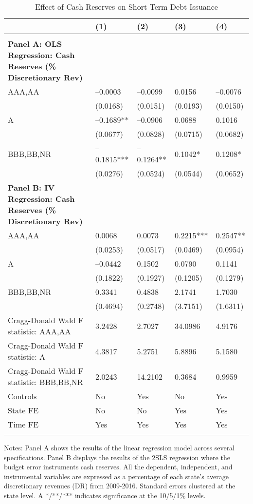 \documentclass{article}
\begin{document}
\begin{table}[tbp] \centering
{}

\caption{Effect of Cash Reserves on Short Term Debt Issuance}
\label{tab:Regression_StDebt}
\begin{tabularx}{\linewidth}{lCCCC}

\toprule
&{(1)}&{(2)}&{(3)}&{(4)} \tabularnewline \midrule
{}&{}&{}&{}&{} \tabularnewline
\midrule \addlinespace[\belowrulesep]
\textbf{Panel A: OLS Regression: Cash Reserves (\% Discretionary Rev)}&&&& \tabularnewline
\midrule AAA,AA&--0.0003&--0.0099&0.0156&--0.0076 \tabularnewline
&(0.0168)&(0.0151)&(0.0193)&(0.0150) \tabularnewline
A&--0.1689**&--0.0906&0.0688&0.1016 \tabularnewline
\midrule &(0.0677)&(0.0828)&(0.0715)&(0.0682) \tabularnewline
BBB,BB,NR&--0.1815***&--0.1264**&0.1042*&0.1208* \tabularnewline
&(0.0276)&(0.0524)&(0.0544)&(0.0652) \tabularnewline
\textbf{Panel B: IV Regression: Cash Reserves (\% Discretionary Rev)}&&&& \tabularnewline
AAA,AA&0.0068&0.0073&0.2215***&0.2547** \tabularnewline
\midrule &(0.0253)&(0.0517)&(0.0469)&(0.0954) \tabularnewline
A&--0.0442&0.1502&0.0790&0.1141 \tabularnewline
&(0.1822)&(0.1927)&(0.1205)&(0.1279) \tabularnewline
BBB,BB,NR&0.3341&0.4838&2.1741&1.7030 \tabularnewline
&(0.4694)&(0.2748)&(3.7151)&(1.6311) \tabularnewline
Cragg-Donald Wald F statistic: AAA,AA&3.2428&2.7027&34.0986&4.9176 \tabularnewline
Cragg-Donald Wald F statistic: A&4.3817&5.2751&5.8896&5.1580 \tabularnewline
Cragg-Donald Wald F statistic: BBB,BB,NR&2.0243&14.2102&0.3684&0.9959 \tabularnewline
Controls&No&Yes&No&Yes \tabularnewline
State FE&No&No&Yes&Yes \tabularnewline
Time FE&Yes&Yes&Yes&Yes \tabularnewline
\bottomrule \addlinespace[\belowrulesep]

\end{tabularx}
\begin{flushleft}
\footnotesize Notes: Panel A shows the results of the linear regression model across several specifications. Panel B displays the results of the 2SLS regression where the budget error instruments cash reserves. All the dependent, independent, and instrumental variables are expressed as a percentage of each state's average discretionary revenues (DR) from 2009-2016. Standard errors clustered at the state level. A */**/*** indicates significance at the 10/5/1\% levels.
\end{flushleft}
\end{table}
\end{document}
